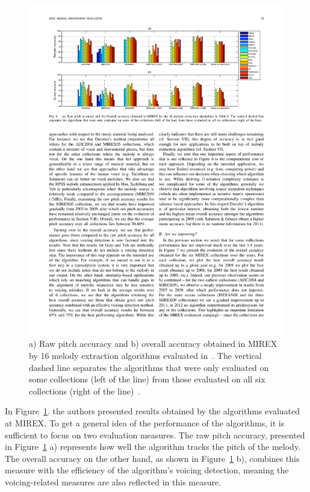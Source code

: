 \begin{figure}[t]
  \centering
    \includegraphics[width=1.1\textwidth]{Figures/comparisonall}
      \caption{a) Raw pitch accuracy and b) overall accuracy obtained in MIREX by 16 melody extraction algorithms evaluated in~\cite{comparison}. The vertical dashed line separates the algorithms that were only evaluated on some collections (left of the line) from those evaluated on all six collections (right of the line)~\cite{comparison}.}
\label{fig:comparison}
\end{figure}


In Figure~\ref{fig:comparison}. the authors presented results obtained by the algorithms evaluated at MIREX. To get a general idea of the performance of the algorithms, it is sufficient to focus on two evaluation measures.
The raw pitch accuracy, presented in Figure~\ref{fig:comparison} a) represents how well the algorithm tracks the pitch of the melody. The overall accuracy on the other hand, as shown in Figure~\ref{fig:comparison} b), combines this measure with the efficiency of the algorithm's voicing detection, meaning the voicing-related measures are also reflected in this measure.


